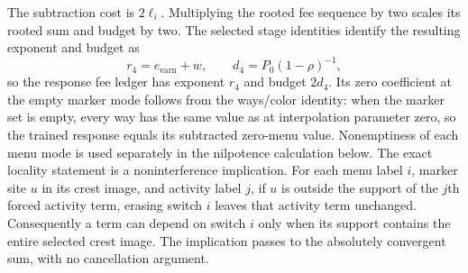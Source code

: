 The subtraction cost is $2\ell_i$. Multiplying the rooted fee sequence
by two scales its rooted sum and budget by two. The selected stage identities identify the resulting exponent and
budget as
\[
 r_4=e_{\mathrm{earn}}+w,\qquad
 d_4=P_0(1-\rho)^{-1},
\]
so the response fee ledger has exponent $r_4$ and budget $2d_4$. Its zero
coefficient at the empty marker mode follows from the ways/color identity:
when the marker set is empty, every way has the same value as at interpolation
parameter zero, so the trained response equals its subtracted zero-menu
value. Nonemptiness of each menu mode is used separately in the nilpotence
calculation below. The exact locality statement is a noninterference implication. For each
menu label $i$, marker site $u$ in its crest image, and activity label $j$,
if $u$ is outside the support of the $j$th forced activity term, erasing
switch $i$ leaves that activity term unchanged. Consequently a term can
depend on switch $i$ only when its support contains the entire selected
crest image. The implication passes to the absolutely convergent sum, with
no cancellation argument.

